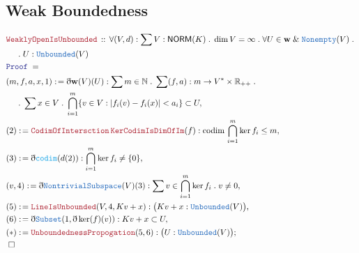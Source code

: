 \documentclass[12pt]{scrartcl}
\newcommand{\TYPE}[1]{\textcolor{NavyBlue}{\mathtt{#1}}}
\newcommand{\FUNC}[1]{\textcolor{Cerulean}{\mathtt{#1}}}
\newcommand{\LOGIC}[1]{\textcolor{Blue}{\mathtt{#1}}}
\newcommand{\THM}[1]{\textcolor{Maroon}{\mathtt{#1}}}
\renewcommand{\.}{\; . \;}
\newcommand{\de}{: \kern 0.1pc =}
\newcommand{\Theorem}[2]{& \THM{#1} \, :: \, #2 \\ & \Proof = \\ }
\newcommand{\NewLine}{\\ & \kern 1pc}
\newcommand{\Page}[1]{\begin{align*} #1 \end{align*} \newpage   }
\newcommand{ \bd }{ \ByDef }
\renewcommand{\And}{\; \& \;}
\newcommand{\Reals}{\mathbb{R} }
\newcommand{\Nat}{\mathbb{N} }
\newcommand{\Say}[3]{& #1 \de #2 : #3, \\}
\newcommand{\Conclude}[3]{& #1 \de #2 : #3; \\}
\newcommand{\QED}{\; \square}
\newcommand{\EndProof}{& \QED \\}
\newcommand{\ByDef}{\eth}
\newcommand{\Proof}{\LOGIC{Proof} \; }
\newcommand{\NORM}{\textsf{NORM}}
\begin{document}
\subsection{Weak Boundedness}
\Page{ 
\Theorem{WeaklyOpenIsUnbounded}{\forall (V,d) : \sum V : \NORM(K) \. \dim V = \infty \. \forall U \in \mathbf{w} \And \TYPE{Nonempty}(V) \. 
\NewLine
 \. U : \TYPE{Unbounded}(V)}
\Say{(m,f,a,x,1)}{\bd \mathbf{w}(V)(U)}{\sum m \in \Nat \.  \sum (f,a) : m \to V^* \times \Reals_{++} \. 
\NewLine
\. \sum x \in V \. \bigcap^m_{i = 1}\{ v \in V : |f_i(v) - f_i(x)| < a_i \} \subset U
  }
\Say{(2)}{ \THM{CodimOfIntersction} \, \THM{KerCodimIsDimOfIm}(f)}{ \mathrm{codim} \, \bigcap^m_{i = 1} \ker f_i \le m}
\Say{(3)}{ \bd \FUNC{codim}( d(2) )}{ \bigcap^m_{i = 1} \ker f_i \neq \{  0 \} }
\Say{(v,4)}{\bd \TYPE{NontrivialSubspace}(V)(3)}{ \sum v \in \bigcap^m_{i = 1} \ker f_i \. v \neq 0 }
\Say{(5)}{\THM{LineIsUnbounded}(V, 4, Kv + x)}{\big(Kv + x : \TYPE{Unbounded}(V)\big)}
\Say{(6)}{ \bd\TYPE{Subset} (1, \bd \ker(f)(v))}{Kv + x \subset U}
\Conclude{(*)}{\THM{UnboundednessPropogation}(5,6)}{ \big(U : \TYPE{Unbounded}(V)\big) }
\EndProof
}
\end{document}
